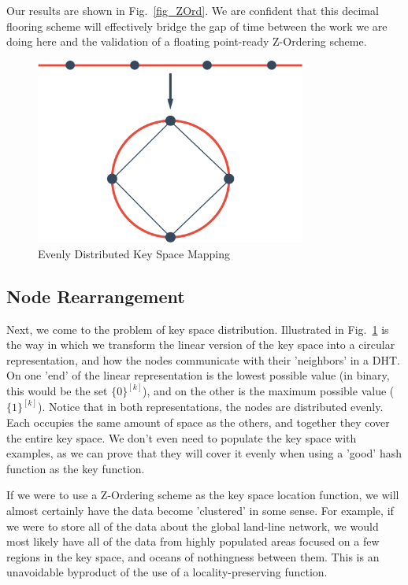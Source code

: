 \documentclass[10pt]{IEEEtran}
\begin{document}

\par Our results are shown in Fig.~\ref{fig_ZOrd}. We are confident that this decimal flooring scheme will effectively bridge the gap of time between the work we are doing here and the validation of a floating point-ready Z-Ordering scheme.

\begin{figure}[!t]
\centering
\includegraphics[width=3.5in]{finalRing}
\caption{Evenly Distributed Key Space Mapping}
\label{fig_kSpace}
\end{figure}

\subsection{Node Rearrangement}
\par Next, we come to the problem of key space distribution. Illustrated in Fig.~\ref{fig_kSpace} is the way in which we transform the linear version of the key space into a circular representation, and how the nodes communicate with their 'neighbors' in a DHT. On one 'end' of the linear representation is the lowest possible value (in binary, this would be the set $\{0\}^{[k]}$), and on the other is the maximum possible value ($\{1\}^{[k]}$). Notice that in both representations, the nodes are distributed evenly. Each occupies the same amount of space as the others, and together they cover the entire key space. We don't even need to populate the key space with examples, as we can prove that they will cover it evenly when using a 'good' hash function as the key function.

\par If we were to use a Z-Ordering scheme as the key space location function, we will almost certainly have the data become 'clustered' in some sense. For example, if we were to store all of the data about the global land-line network, we would most likely have all of the data from highly populated areas focused on a few regions in the key space, and oceans of nothingness between them. This is an unavoidable byproduct of the use of a locality-preserving function.
\end{document}
